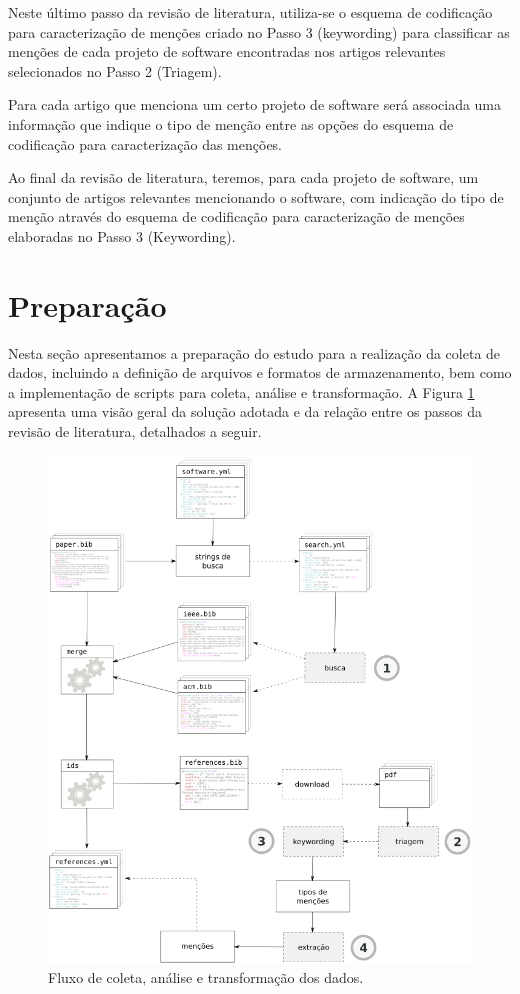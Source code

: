 Neste último passo da revisão de literatura, utiliza-se o esquema de codificação
para caracterização de menções criado no Passo 3 (keywording) para classificar as
menções de cada projeto de software encontradas nos artigos relevantes
selecionados no Passo 2 (Triagem).

Para cada artigo que menciona um certo projeto de software será associada uma
informação que indique o tipo de menção entre as opções do esquema de codificação
para caracterização das menções.

Ao final da revisão de literatura, teremos, para cada projeto de software, um
conjunto de artigos relevantes mencionando o software, com indicação do tipo de menção
através do esquema de codificação para caracterização de menções elaboradas no Passo 3 (Keywording).


\section{Preparação} \label{estudo2:preparacao} %

Nesta seção apresentamos a preparação do estudo para a realização da coleta de
dados, incluindo a definição de arquivos e formatos de armazenamento, bem como
a implementação de scripts para coleta, análise e transformação.
A Figura \ref{estudo2-fluxograma} apresenta uma visão geral da solução adotada
e da relação entre os passos da revisão de literatura, detalhados a seguir.

\begin{figure}[h]
  \center
  \includegraphics[scale=0.35]{imagens/estudo2-fluxograma.png}
  \caption{Fluxo de coleta, análise e transformação dos dados.}
  \label{estudo2-fluxograma}
\end{figure}


